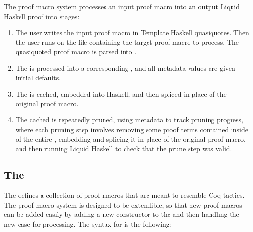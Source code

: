% 
% 
  



The proof macro system processes an input proof macro into an output Liquid Haskell proof into stages:
\begin{enumerate}
  \item 
  The user writes the input proof macro in Template Haskell quasiquotes. 
  Then the user runs \TheTool {} on the file containing the target proof macro to process. 
  The quasiquoted proof macro is parsed into \LangA.
  \item
  The \LangATerm is processed into a corresponding \LangBTerm, and all metadata values are given initial defaults.
  \item
  The \LangBTerm is cached, embedded into Haskell, and then spliced in place of the original proof macro. 
  \item 
  The cached \LangBTerm is repeatedly pruned, using metadata to track pruning progress, where each pruning step involves removing some proof terms contained inside of the entire \LangBTerm, embedding and splicing it in place of the original proof macro, and then running Liquid Haskell to check that the prune step was valid.
\end{enumerate}
  
\subsection{The \LangA}

The \LangA defines a collection of proof macros that are meant to resemble Coq tactics.
The proof macro system is designed to be extendible, so that new proof macros can be added easily by adding a new constructor to the \LangA and then handling the new case for processing.
The syntax for \LangA is the following:

